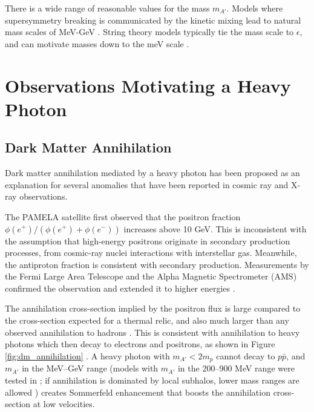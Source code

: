 There is a wide range of reasonable values for the mass $m_{A'}$.
Models where supersymmetry breaking is communicated by the kinetic mixing lead to natural mass scales of MeV-GeV \cite{baumgart_non-abelian_2009, morrissey_abelian_2009, cheung_kinetic_2009}.
String theory models typically tie the mass scale to $\epsilon$, and can motivate masses down to the meV scale \cite{goodsell_naturally_2009,cicoli_testing_2011}.

%


%
%

\section{Observations Motivating a Heavy Photon}

\subsection{Dark Matter Annihilation}

Dark matter annihilation mediated by a heavy photon has been proposed as an explanation for several anomalies that have been reported in cosmic ray and X-ray observations.

The PAMELA satellite first observed that the positron fraction $\phi(e^+)/(\phi(e^+)+\phi(e^-))$ increases above 10 GeV.
This is inconsistent with the assumption that high-energy positrons originate in secondary production processes, from cosmic-ray nuclei interactions with interstellar gas.
Meanwhile, the antiproton fraction is consistent with secondary production.
Measurements by the Fermi Large Area Telescope and the Alpha Magnetic Spectrometer (AMS) confirmed the observation and extended it to higher energies \cite{the_fermi_lat_collaboration_measurement_2012,ams_collaboration_first_2013}.

The annihilation cross-section implied by the positron flux is large compared to the cross-section expected for a thermal relic, and also much larger than any observed annihilation to hadrons \cite{cholis_high_2009}.
This is consistent with annihilation to heavy photons which then decay to electrons and positrons, as shown in Figure \ref{fig:dm_annihilation} \cite{arkani-hamed_theory_2009}.
A heavy photon with $m_{A'}<2m_p$ cannot decay to $p\bar{p}$, and $m_{A'}$ in the MeV--GeV range (models with $m_{A'}$ in the 200--900 MeV range were tested in \cite{finkbeiner_consistent_2011}; if annihilation is dominated by local subhalos, lower mass ranges are allowed \cite{slatyer_sommerfeld-enhanced_2012}) creates Sommerfeld enhancement that boosts the annihilation cross-section at low velocities.

